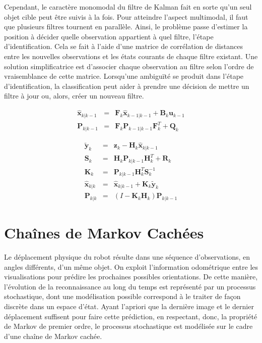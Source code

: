 Cependant, le caractère monomodal du filtre de Kalman fait en sorte
qu'un seul objet cible peut être suivis à la fois. Pour atteindre
l'aspect multimodal, il faut que plusieurs filtres tournent en
parallèle. Ainsi, le problème passe d’estimer la position à décider
quelle observation appartient à quel filtre, l'étape
d'identification. Cela se fait à l'aide d'une matrice de corrélation
de distances entre les nouvelles observations et les états courants de
chaque filtre existant. Une solution simplificatrice est d'associer
chaque observation au filtre selon l'ordre de vraisemblance de cette
matrice. Lorsqu’une ambiguïté se produit dans l'étape
d'identification, la classification peut aider à prendre une décision
de mettre un filtre à jour ou, alors, créer un nouveau filtre.

\begin{equation*}
	\begin{array}{ccl}
		\hat{\textbf{x}}_{k|k-1} &=& \textbf{F}_{k}\hat{\textbf{x}}_{k-1|k-1} + \textbf{B}_{k} \textbf{u}_{k-1}\\
		\textbf{P}_{k|k-1} &=& \textbf{F}_{k} \textbf{P}_{k-1|k-1} \textbf{F}_{k}^{T} + \textbf{Q}_{k}
	\end{array}
\end{equation*}

\begin{equation*}
	\begin{array}{ccl}
\tilde{\textbf{y}}_{k} &=& \textbf{z}_{k} - \textbf{H}_{k}\hat{\textbf{x}}_{k|k-1} \\
\textbf{S}_{k} &=& \textbf{H}_{k}\textbf{P}_{k|k-1} \textbf{H}_{k}^{T}+\textbf{R}_{k} \\
\textbf{K}_{k} &=& \textbf{P}_{k|k-1}\textbf{H}_{k}^{T}\textbf{S}_{k}^{-1} \\
\hat{\textbf{x}}_{k|k} &=& \hat{\textbf{x}}_{k|k-1} + \textbf{K}_{k}\tilde{\textbf{y}}_{k} \\
\textbf{P}_{k|k} &=& (I - \textbf{K}_{k} \textbf{H}_{k}) \textbf{P}_{k|k-1}
	\end{array}
\end{equation*}

\section {Chaînes de Markov Cachées}

Le déplacement physique du robot résulte dans une séquence
d'observations, en angles différents, d'un même objet. On exploit
l'information odométrique entre les visualisations pour prédire les
prochaines possibles orientations. De cette manière, l'évolution de la
reconnaissance au long du temps est représenté par un processus
stochastique, dont une modélisation possible correspond à le traiter
de façon discrète dans un espace d'état. Ayant l'apriori que la
dernière image et le dernier déplacement suffisent pour faire cette
prédiction, en respectant, donc, la propriété de Markov de premier
ordre, le processus stochastique est modélisée sur le cadre d'une
chaîne de Markov cachée.

